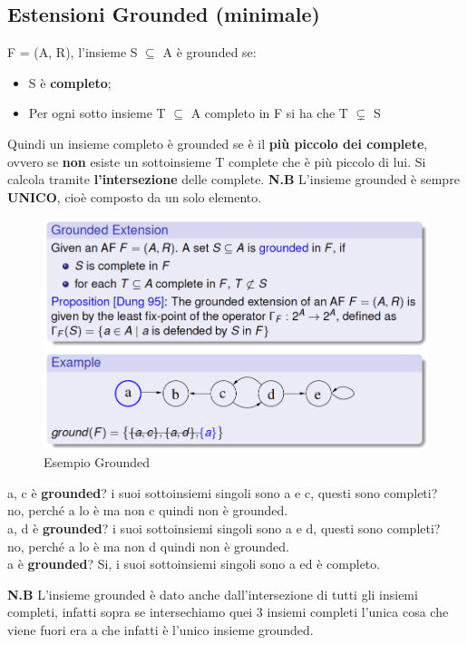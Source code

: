 \subsection{Estensioni Grounded (minimale)}
F = (A, R), l'insieme S $\subseteq$ A è grounded se:
\begin{itemize}
    \item S è \textbf{completo};
    \item Per ogni sotto insieme T $\subseteq$ A completo in F si ha che T $\subsetneq$ S
\end{itemize}
Quindi un insieme completo è grounded se è il \textbf{più piccolo dei complete}, ovvero se \textbf{non} esiste un sottoinsieme T complete che è più piccolo di lui. Si calcola tramite \textbf{l'intersezione} delle complete.
\textbf{N.B} L'insieme grounded è sempre \textbf{UNICO}, cioè composto da un solo elemento.
\begin{figure}[H]
    \centering
    \includegraphics[width=12cm, keepaspectratio]{img/Cap6/grounded.png}
    \caption{Esempio Grounded}
\end{figure}
a, c è \textbf{grounded}? i suoi sottoinsiemi singoli sono a e c, questi sono completi?
\\no, perché a lo è ma non c quindi non è grounded.
\\a, d è \textbf{grounded}? i suoi sottoinsiemi singoli sono a e d, questi sono completi?
\\no, perché a lo è ma non d quindi non è grounded.
\\a è \textbf{grounded}? Si, i suoi sottoinsiemi singoli sono a ed è completo.

\vspace{0.8cm}

\textbf{N.B} L'insieme grounded è dato anche dall'intersezione di tutti gli insiemi completi, infatti sopra se intersechiamo quei 3 insiemi completi l'unica cosa che viene fuori era a che infatti è l'unico insieme grounded.

